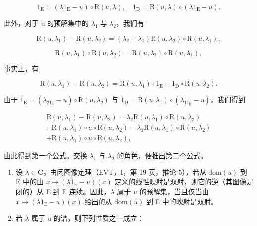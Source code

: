 \[
1 _ {\mathrm{E}} = (\lambda 1 _ {\mathrm{E}} - u) \circ \mathrm{R} (u, \lambda), \quad 1 _ {\mathrm{D}} = \mathrm{R} (u, \lambda) \circ (\lambda 1 _ {\mathrm{E}} - u).\tag{7}
\]

此外，对于 u 的预解集中的 \(\lambda_{1}\) 与 \(\lambda_{2}\)，我们有

\[
\mathrm{R} (u, \lambda_ {1}) - \mathrm{R} (u, \lambda_ {2}) = (\lambda_ {2} - \lambda_ {1}) \mathrm{R} (u, \lambda_ {2}) \circ \mathrm{R} (u, \lambda_ {1}),\tag{8}
\]

\[
\mathrm{R} (u, \lambda_ {1}) \circ \mathrm{R} (u, \lambda_ {2}) = \mathrm{R} (u, \lambda_ {2}) \circ \mathrm{R} (u, \lambda_ {1}),\tag{9}
\]

事实上，有

\[
\mathrm{R} (u, \lambda_ {1}) - \mathrm{R} (u, \lambda_ {2}) = \mathrm{R} (u, \lambda_ {1}) \circ 1 _ {\mathrm{E}} - 1 _ {\mathrm{D}} \circ \mathrm{R} (u, \lambda_ {2}).
\]

由于 \(1_{\mathrm{E}} = (\lambda_21_{\mathrm{E}} - u)\circ \mathrm{R}(u,\lambda_2)\) 与 \(1_{\mathrm{D}} = \mathrm{R}(u,\lambda_1)\circ (\lambda_11_{\mathrm{E}} - u)\)，我们得到

\[
\begin{array}{c} \mathrm{R} (u, \lambda_ {1}) - \mathrm{R} (u, \lambda_ {2}) = \lambda_ {2} \mathrm{R} (u, \lambda_ {1}) \circ \mathrm{R} (u, \lambda_ {2}) \\ - \mathrm{R} (u, \lambda_ {1}) \circ u \circ \mathrm{R} (u, \lambda_ {2}) - \lambda_ {1} \mathrm{R} (u, \lambda_ {1}) \circ \mathrm{R} (u, \lambda_ {2}) \\ + \mathrm{R} (u, \lambda_ {1}) \circ u \circ \mathrm{R} (u, \lambda_ {2}), \end{array}
\]

由此得到第一个公式。交换 \(\lambda_{1}\) 与 \(\lambda_{2}\) 的角色，便推出第二个公式。

\begin{enumerate}
\def\labelenumi{\arabic{enumi})}
\setcounter{enumi}{2}
\item
  设 \(\lambda \in \mathbf{C}\)。由闭图像定理（EVT，I，第 19 页，推论 5），若从 \(\mathrm{dom}(u)\) 到 E 中的由 \(x \mapsto (\lambda 1_{\mathrm{E}} - u)(x)\) 定义的线性映射是双射，则它的逆（其图像是闭的）从 E 到 E 连续。因此，\(\lambda\) 属于 \(u\) 的预解集，当且仅当由 \(x \mapsto (\lambda 1_{\mathrm{E}} - u)(x)\) 给出的从 \(\mathrm{dom}(u)\) 到 E 中的映射是双射。
\item
  若 \(\lambda\) 属于 u 的谱，则下列性质之一成立：
\end{enumerate}

